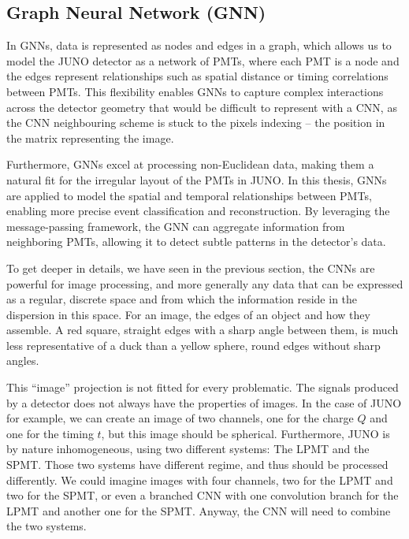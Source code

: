 \documentclass[../main.tex]{subfiles}
\begin{document}
\subsection{Graph Neural Network (GNN)}
\label{sec:ml:gnn}

In GNNs, data is represented as nodes and edges in a graph, which allows us to model the JUNO detector as a network of PMTs, where each PMT is a node and the edges represent relationships such as spatial distance or timing correlations between PMTs. This flexibility enables GNNs to capture complex interactions across the detector geometry that would be difficult to represent with a CNN, as the CNN neighbouring scheme is stuck to the pixels indexing -- the position in the matrix representing the image.

Furthermore, GNNs excel at processing non-Euclidean data, making them a natural fit for the irregular layout of the PMTs in JUNO.
In this thesis, GNNs are applied to model the spatial and temporal relationships between PMTs, enabling more precise event classification and reconstruction. By leveraging the message-passing framework, the GNN can aggregate information from neighboring PMTs, allowing it to detect subtle patterns in the detector's data.

To get deeper in details, we have seen in the previous section, the CNNs are powerful for image processing, and more generally any data that can be expressed as a regular, discrete space and from which the information reside in the dispersion in this space. For an image, the edges of an object and how they assemble. A red square, straight edges with a sharp angle between them, is much less representative of a duck than a yellow sphere, round edges without sharp angles.

This ``image'' projection is not fitted for every problematic. The signals produced by a detector does not always have the properties of images. In the case of JUNO for example, we can create an image of two channels, one for the charge $Q$ and one for the timing $t$, but this image should be spherical. Furthermore, JUNO is by nature inhomogeneous, using two different systems: The LPMT and the SPMT. Those two systems have different regime, and thus should be processed differently. We could imagine images with four channels, two for the LPMT and two for the SPMT, or even a branched CNN with one convolution branch for the LPMT and another one for the SPMT. Anyway, the CNN will need to combine the two systems.
\end{document}

